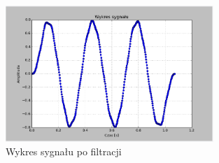 \documentclass{article}
\begin{document}
{{            \begin{figure}[h!]
                \centering
                \includegraphics[width=0.7\textwidth]{img/fil12.png}
                \caption{Wykres sygnału po filtracji}
            \end{figure}
            \FloatBarrier
        }
        \newpage

}
\end{document}
